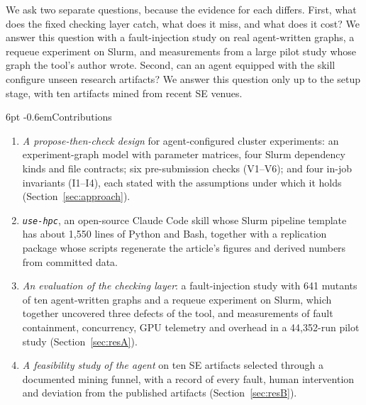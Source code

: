 \documentclass[pdflatex,sn-mathphys-num]{sn-jnl}
\makeatletter
\theoremstyle{thmstyletwo}%
\theoremstyle{thmstylethree}%
\newcommand{\tool}{\texttt{use-hpc}}
\newcommand{\V}[1]{\textsf{V#1}}
\newcommand{\I}[1]{\textsf{I#1}}
\renewcommand\paragraph{\@startsection{paragraph}{4}{\z@}%
  {6pt \@plus 2pt \@minus 1pt}{-0.6em}{\normalfont\normalsize\bfseries}}
\makeatother
\begin{document}
We ask two separate questions, because the evidence for each differs. First, what does the fixed checking layer catch, what does it miss, and what does it cost? We answer this question with a fault-injection study on real agent-written graphs, a requeue experiment on Slurm, and measurements from a large pilot study whose graph the tool's author wrote. Second, can an agent equipped with the skill configure unseen research artifacts? We answer this question only up to the setup stage, with ten artifacts mined from recent SE venues.

\paragraph{Contributions}
\begin{enumerate}[label=\textbf{C\arabic*}, leftmargin=2.2em, itemsep=1pt]
\item \emph{A propose-then-check design} for agent-configured cluster experiments: an experiment-graph model with parameter matrices, four Slurm dependency kinds and file contracts; six pre-submission checks (\V{1}--\V{6}); and four in-job invariants (\I{1}--\I{4}), each stated with the assumptions under which it holds (Section~\ref{sec:approach}).
\item \emph{\tool{}}, an open-source Claude Code skill whose Slurm pipeline template has about 1{,}550 lines of Python and Bash, together with a replication package whose scripts regenerate the article's figures and derived numbers from committed data.
\item \emph{An evaluation of the checking layer}: a fault-injection study with 641 mutants of ten agent-written graphs and a requeue experiment on Slurm, which together uncovered three defects of the tool, and measurements of fault containment, concurrency, GPU telemetry and overhead in a 44{,}352-run pilot study (Section~\ref{sec:resA}).
\item \emph{A feasibility study of the agent} on ten SE artifacts selected through a documented mining funnel, with a record of every fault, human intervention and deviation from the published artifacts (Section~\ref{sec:resB}).
\end{enumerate}
\end{document}
